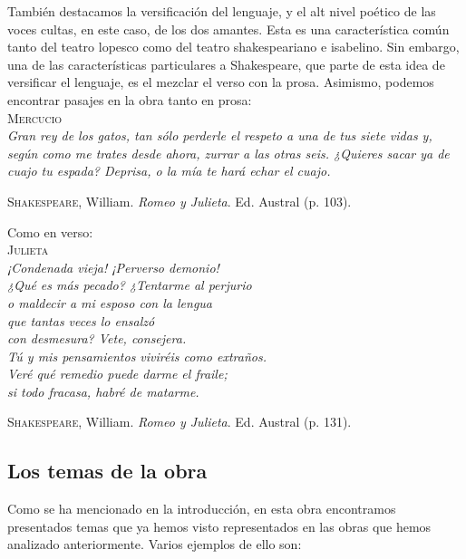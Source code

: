 \documentclass[12pt,a4paper]{article}
\begin{document}
También destacamos la versificación del lenguaje, y el alt nivel poético de las voces cultas, en este caso, de los dos amantes. Esta es una característica común tanto del teatro lopesco como del teatro shakespeariano e isabelino. Sin embargo, una de las características particulares a Shakespeare, que parte de esta idea de versificar el lenguaje, es el mezclar el verso con la prosa. Asimismo, podemos encontrar pasajes en la obra tanto en prosa:\\

\textsc{Mercucio}\\
\indent\textit{Gran rey de los gatos, tan sólo perderle el respeto a una de tus siete vidas y, según como me trates desde ahora, zurrar a las otras seis. ¿Quieres sacar ya de cuajo tu espada? Deprisa, o la mía te hará echar el cuajo.}\\
\begin{flushright}
	\textsc{Shakespeare}, William. \textit{Romeo y Julieta}. Ed. Austral (p. 103).\\
\end{flushright}

Como en verso:\\

\textsc{Julieta}\\
\indent\textit{¡Condenada vieja! ¡Perverso demonio!}\\
\indent\textit{¿Qué es más pecado? ¿Tentarme al perjurio}\\
\indent\textit{o maldecir a mi esposo con la lengua}\\
\indent\textit{que tantas veces lo ensalzó}\\
\indent\textit{con desmesura? Vete, consejera.}\\
\indent\textit{Tú y mis pensamientos viviréis como extraños.}\\
\indent\textit{Veré qué remedio puede darme el fraile;}\\
\indent\textit{si todo fracasa, habré de matarme.}\\
\begin{flushright}
	\textsc{Shakespeare}, William. \textit{Romeo y Julieta}. Ed. Austral (p. 131).\\
\end{flushright}

\subsection{Los temas de la obra}

Como se ha mencionado en la introducción, en esta obra encontramos presentados temas que ya hemos visto representados en las obras que hemos analizado anteriormente. Varios ejemplos de ello son:
\end{document}
